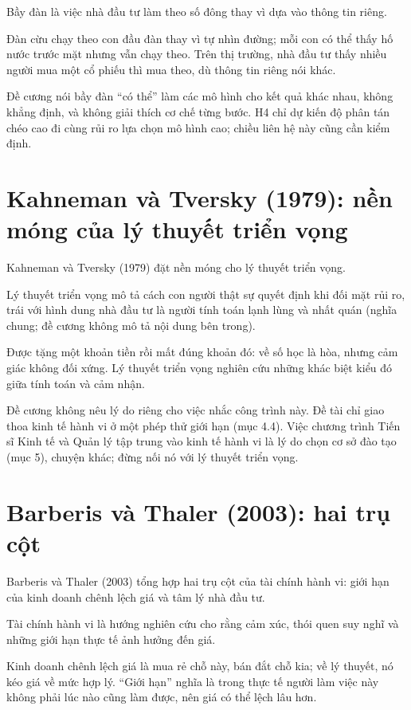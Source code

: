 Bầy đàn là việc nhà đầu tư làm theo số đông thay vì dựa vào thông tin riêng.

Đàn cừu chạy theo con đầu đàn thay vì tự nhìn đường; mỗi con có thể thấy hố nước trước mặt nhưng vẫn chạy theo. Trên thị trường, nhà đầu tư thấy nhiều người mua một cổ phiếu thì mua theo, dù thông tin riêng nói khác.

Đề cương nói bầy đàn “có thể” làm các mô hình cho kết quả khác nhau, không khẳng định, và không giải thích cơ chế từng bước. H4 chỉ dự kiến độ phân tán chéo cao đi cùng rủi ro lựa chọn mô hình cao; chiều liên hệ này cũng cần kiểm định.

\section{Kahneman và Tversky (1979): nền móng của lý thuyết triển vọng}

Kahneman và Tversky (1979) đặt nền móng cho lý thuyết triển vọng.

Lý thuyết triển vọng mô tả cách con người thật sự quyết định khi đối mặt rủi ro, trái với hình dung nhà đầu tư là người tính toán lạnh lùng và nhất quán (nghĩa chung; đề cương không mô tả nội dung bên trong).

Được tặng một khoản tiền rồi mất đúng khoản đó: về số học là hòa, nhưng cảm giác không đối xứng. Lý thuyết triển vọng nghiên cứu những khác biệt kiểu đó giữa tính toán và cảm nhận.

Đề cương không nêu lý do riêng cho việc nhắc công trình này. Đề tài chỉ giao thoa kinh tế hành vi ở một phép thử giới hạn (mục 4.4). Việc chương trình Tiến sĩ Kinh tế và Quản lý tập trung vào kinh tế hành vi là lý do chọn cơ sở đào tạo (mục 5), chuyện khác; đừng nối nó với lý thuyết triển vọng.

\section{Barberis và Thaler (2003): hai trụ cột}

Barberis và Thaler (2003) tổng hợp hai trụ cột của tài chính hành vi: giới hạn của kinh doanh chênh lệch giá và tâm lý nhà đầu tư.

Tài chính hành vi là hướng nghiên cứu cho rằng cảm xúc, thói quen suy nghĩ và những giới hạn thực tế ảnh hưởng đến giá.

Kinh doanh chênh lệch giá là mua rẻ chỗ này, bán đắt chỗ kia; về lý thuyết, nó kéo giá về mức hợp lý. “Giới hạn” nghĩa là trong thực tế người làm việc này không phải lúc nào cũng làm được, nên giá có thể lệch lâu hơn.

